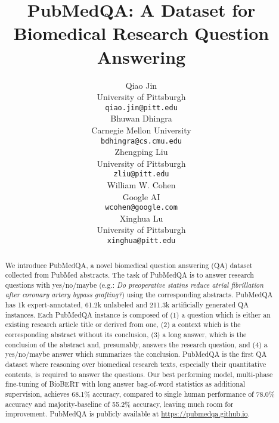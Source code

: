\documentclass[11pt,a4paper]{article}
\title{PubMedQA: A Dataset for Biomedical Research Question Answering}
\author{Qiao Jin \\
  University of Pittsburgh \\
  {\tt qiao.jin@pitt.edu} \\\And
  Bhuwan Dhingra \\
  Carnegie Mellon University \\
  {\tt bdhingra@cs.cmu.edu} \\\And
  Zhengping Liu \\
  University of Pittsburgh \\
  {\tt zliu@pitt.edu} \\
  \AND
  William W. Cohen \\
  Google AI \\
  {\tt wcohen@google.com} \\\And
  Xinghua Lu \\
  University of Pittsburgh \\
  {\tt xinghua@pitt.edu} \\
  }
\date{}
\begin{document}
\setlength{\abovedisplayskip}{8pt}
\setlength{\belowdisplayskip}{8pt}


\maketitle
\begin{abstract}
We introduce PubMedQA, a novel biomedical question answering (QA) dataset collected from PubMed abstracts. The task of PubMedQA is to answer research questions with yes/no/maybe 
(e.g.: \textit{Do preoperative statins reduce atrial fibrillation after coronary artery bypass grafting?})
using the corresponding abstracts. PubMedQA has 1k expert-annotated, 61.2k unlabeled and 211.3k artificially generated QA instances. Each PubMedQA instance is composed of (1) a question which is either an existing research article title or derived from one, (2) a context which is the corresponding abstract without its conclusion, (3) a long answer, which is the conclusion of the abstract and, presumably, answers the research question, and (4) a yes/no/maybe answer which summarizes the conclusion. PubMedQA is the first QA dataset where reasoning over biomedical research texts, especially their quantitative contents, is required to answer the questions. Our best performing model, multi-phase fine-tuning of BioBERT with long answer bag-of-word statistics as additional supervision, achieves 68.1\% accuracy, compared to single human performance of 78.0\% accuracy and majority-baseline of 55.2\% accuracy, leaving much room for improvement. PubMedQA is publicly available at \url{https://pubmedqa.github.io}.
\end{abstract}
\end{document}
